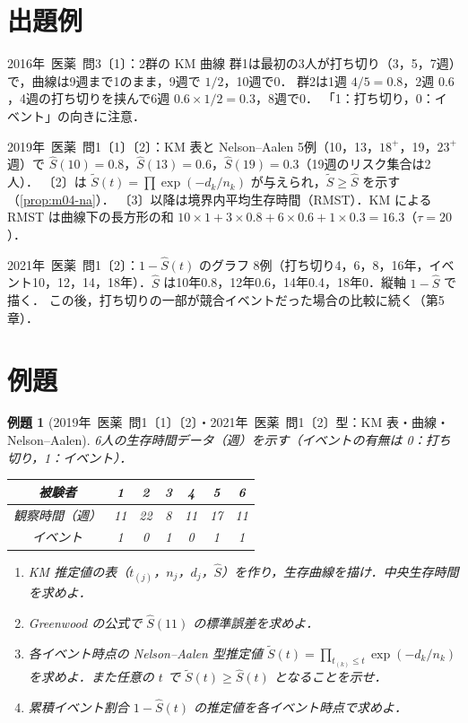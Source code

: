 \documentclass[a4paper,11pt,openany]{ltjsbook}
\newtheorem{reidai}{例題}[chapter]
\newcommand{\kakomon}[2]{\mbox{#1年 医薬 問#2}}
\begin{document}
\section{出題例}\label{sec:m04-shutsudai}
\begin{shutsudai}{\kakomon{2016}{3}〔1〕：2群の KM 曲線}
群1は最初の3人が打ち切り（3，5，7週）で，曲線は9週まで1のまま，9週で $1/2$，10週で0．
群2は1週 $4/5=0.8$，2週 $0.6$，4週の打ち切りを挟んで6週 $0.6\times1/2=0.3$，8週で0．
「1：打ち切り，0：イベント」の向きに注意．
\end{shutsudai}
\begin{shutsudai}{\kakomon{2019}{1}〔1〕〔2〕：KM 表と Nelson--Aalen}
5例（10，13，$18^+$，19，$23^+$ 週）で $\hat S(10)=0.8$，$\hat S(13)=0.6$，$\hat S(19)=0.3$（19週のリスク集合は2人）．
〔2〕は $\tilde S(t)=\prod\exp(-d_k/n_k)$ が与えられ，$\tilde S\ge\hat S$ を示す（\cref{prop:m04-na}）．
〔3〕以降は境界内平均生存時間（RMST）．KM による RMST は曲線下の長方形の和 $10\times1+3\times0.8+6\times0.6+1\times0.3=16.3$（$\tau=20$）．
\end{shutsudai}
\begin{shutsudai}{\kakomon{2021}{1}〔2〕：$1-\hat S(t)$ のグラフ}
8例（打ち切り4，6，8，16年，イベント10，12，14，18年）．$\hat S$ は10年0.8，12年0.6，14年0.4，18年0．縦軸 $1-\hat S$ で描く．
この後，打ち切りの一部が競合イベントだった場合の比較に続く（第5章）．
\end{shutsudai}

\section{例題}\label{sec:m04-reidai}
\begin{reidai}[\kakomon{2019}{1}〔1〕〔2〕・\kakomon{2021}{1}〔2〕型：KM 表・曲線・Nelson--Aalen]\label{reidai:m04-1}
6人の生存時間データ（週）を示す（イベントの有無は 0：打ち切り，1：イベント）．
\begin{center}\small
\begin{tabular}{@{}ccccccc@{}}
\toprule
被験者 & 1 & 2 & 3 & 4 & 5 & 6\\
\midrule
観察時間（週） & 11 & 22 & 8 & 11 & 17 & 11\\
イベント & 1 & 0 & 1 & 0 & 1 & 1\\
\bottomrule
\end{tabular}
\end{center}
\begin{enumerate}[label=〔\arabic*〕]
\item KM 推定値の表（$t_{(j)}$，$n_j$，$d_j$，$\hat S$）を作り，生存曲線を描け．中央生存時間を求めよ．
\item Greenwood の公式で $\hat S(11)$ の標準誤差を求めよ．
\item 各イベント時点の Nelson--Aalen 型推定値 $\tilde S(t)=\prod_{t_{(k)}\le t}\exp(-d_k/n_k)$ を求めよ．また任意の $t$ で $\tilde S(t)\ge\hat S(t)$ となることを示せ．
\item 累積イベント割合 $1-\hat S(t)$ の推定値を各イベント時点で求めよ．
\end{enumerate}
\end{reidai}
\end{document}
